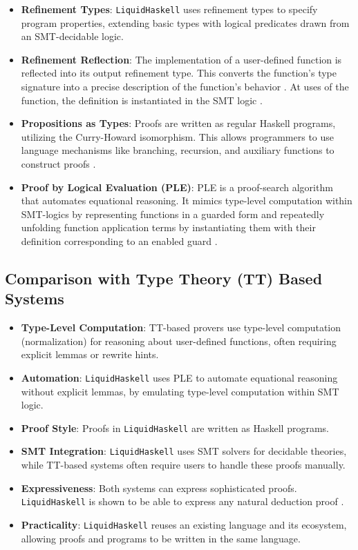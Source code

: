 \documentclass[]{rptuseminar}
\begin{document}
\begin{itemize}
  \item \textbf{Refinement Types}: \texttt{LiquidHaskell} uses refinement types to specify program properties, 
        extending basic types with logical predicates drawn from an SMT-decidable logic.
    \item \textbf{Refinement Reflection}: The implementation of a user-defined function is reflected into 
      its output refinement type. This converts the function's type signature into a precise description of the function's behavior 
      . At uses of the function, the definition is instantiated in the SMT logic \cite{vazou_refinement_2018}.
   \item \textbf{Propositions as Types}: Proofs are written as regular Haskell programs, 
     utilizing the Curry-Howard isomorphism. This allows programmers to use language mechanisms 
     like branching, recursion, and auxiliary functions to construct proofs \cite{vazou_refinement_2018}.
   \item \textbf{Proof by Logical Evaluation (PLE)}: PLE is a proof-search algorithm that automates 
     equational reasoning. It mimics type-level computation within SMT-logics by representing 
     functions in a guarded form and repeatedly unfolding function application terms by instantiating them 
     with their definition corresponding to an enabled guard \cite{vazou_refinement_2018}.
\end{itemize}

\subsection*{Comparison with Type Theory (TT) Based Systems}

\begin{itemize}
    \item \textbf{Type-Level Computation}: TT-based provers use type-level computation (normalization) 
      for reasoning about user-defined functions, often requiring explicit lemmas or rewrite hints.
    \item \textbf{Automation}: \texttt{LiquidHaskell} uses PLE to automate equational reasoning 
      without explicit lemmas, by emulating type-level computation within SMT logic. 
     \item  \textbf{Proof Style}: Proofs in \texttt{LiquidHaskell} are written as Haskell programs.
    \item  \textbf{SMT Integration}: \texttt{LiquidHaskell} uses SMT solvers for decidable theories, 
        while TT-based systems often require users to handle these proofs manually.
    \item \textbf{Expressiveness}: Both systems can express sophisticated proofs. \texttt{LiquidHaskell} is shown 
      to be able to express any natural deduction proof \cite{vazou_refinement_2018}.
   \item \textbf{Practicality}: \texttt{LiquidHaskell} reuses an existing language and its ecosystem, 
     allowing proofs and programs to be written in the same language. 
\end{itemize}
\end{document}
